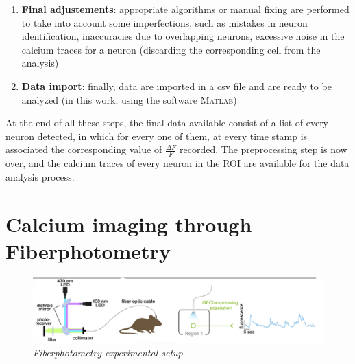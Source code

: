 \documentclass[12pt, a4paper]{report}
\begin{document}
\begin{enumerate}
	\item \textbf{Final adjustements}: appropriate algorithms or manual fixing are performed to take into account some imperfections, such as mistakes in neuron identification, inaccuracies due to overlapping neurons, excessive noise in the calcium traces for a neuron (discarding the corresponding cell from the analysis)
	
	\item \textbf{Data import}: finally, data are imported in a csv file and are ready to be analyzed (in this work, using the software \textsc{Matlab})
	
\end{enumerate} 


At the end of all these steps, the final data available consist of a list of every neuron detected, in which for every one of them, at every time stamp is associated the corresponding value of $\frac{\Delta F }{F}$ recorded. The preprocessing step is now over, and the calcium traces of every neuron in the ROI are available for the data analysis process.	


\newpage
\section{Calcium imaging through Fiberphotometry} \label{section 1.4}

\begin{figure}[H]
	\begin{center}
		\includegraphics[scale=.55]{fiberphotometry.png} 
	\end{center} 
	\caption{\textit{Fiberphotometry experimental setup}}
	\label{fiberphotometry}
\end{figure}
\end{document}
